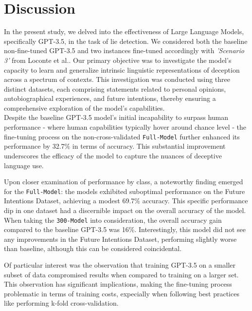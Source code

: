 \documentclass[10pt,twocolumn,letterpaper]{article}
\begin{document}
\section{Discussion}

In the present study, we delved into the effectiveness of Large Language Models, specifically GPT-3.5, in the task of lie detection.
We considered both the baseline non-fine-tuned GPT-3.5 and two instances fine-tuned accordingly with \textit{'Scenario 3'} from Loconte et al.\cite{Loconte}. 
Our primary objective was to investigate the model's capacity to learn and generalize intrinsic linguistic representations of deception 
across a spectrum of contexts. This investigation was conducted using three distinct datasets, each comprising 
statements related to personal opinions, autobiographical experiences, and future intentions, thereby ensuring 
a comprehensive exploration of the model's capabilities. \\

Despite the baseline GPT-3.5 model's initial incapability to surpass human performance - where human capabilities 
typically hover around chance level - the fine-tuning process on the non-cross-validated \texttt{Full-Model} further enhanced its performance by 32.7\% in terms 
of accuracy.
This substantial improvement underscores the efficacy of the model to capture the nuances of deceptive language use.

Upon closer examination of performance by class, a noteworthy finding emerged for the \texttt{Full-Model}: the models exhibited 
suboptimal performance on the Future Intentions Dataset, achieving a modest 69.7\% accuracy. 
This specific performance dip in one dataset had a discernible impact on the overall accuracy of the model. \\

When taking the \texttt{300-Model} into consideration, the overall accuracy gain compared to the baseline GPT-3.5 was 16\%. 
Interestingly, this model did not see any improvements in the Future Intentions Dataset, performing slightly worse than baseline,
although this can be considered coincidental.

Of particular interest was the observation that training GPT-3.5 on a smaller subset of data compromised
results when compared to training on a larger set. This observation has significant 
implications, making the fine-tuning process problematic in terms of training costs, 
expecially when following best practices like performing k-fold cross-validation. \\
\end{document}
